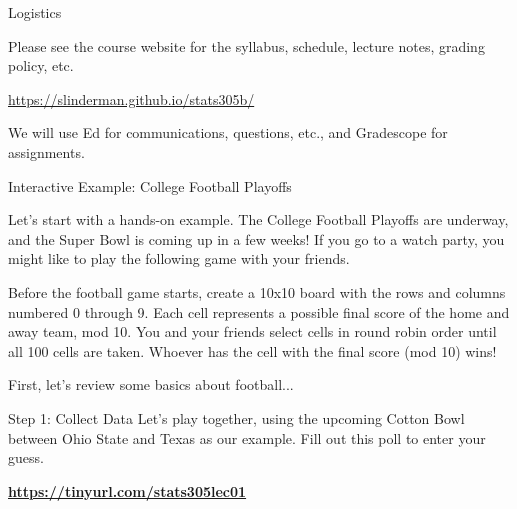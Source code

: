 \documentclass[aspectratio=169]{beamer}
\begin{document}

\begin{frame}{Logistics}

Please see the course website for the syllabus, schedule, lecture notes, grading policy, etc.

\begin{center}
  \textcolor{blue}{\url{https://slinderman.github.io/stats305b/}}
\end{center}

We will use Ed for communications, questions, etc., and Gradescope for assignments.

\end{frame}

\begin{frame}[t,allowframebreaks]{Interactive Example: College Football Playoffs}
  \label{demo-college-football-playoffs}
  
  Let's start with a hands-on example. The College Football Playoffs are
  underway, and the Super Bowl is coming up in a few weeks! If you go to a
  watch party, you might like to play the following game with your
  friends. 
  
  Before the football game starts, create a 10x10 board with the
  rows and columns numbered 0 through 9. Each cell represents a possible
  final score of the home and away team, mod 10. You and your friends
  select cells in round robin order until all 100 cells are taken. Whoever
  has the cell with the final score (mod 10) wins!

  First, let's review some basics about football... 
\end{frame}

\begin{frame}[t]{Step 1: Collect Data}
  Let's play together, using the upcoming Cotton Bowl between Ohio State
  and Texas as our example. Fill out this poll to enter your guess.
  
  \begin{center}
      \textbf{\textcolor{blue}{\url{https://tinyurl.com/stats305lec01}}}
  \end{center}
  
\end{frame}
\end{document}
